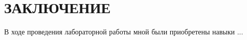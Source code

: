 \section*{ЗАКЛЮЧЕНИЕ}

В ходе проведения лабораторной работы мной были приобретены
навыки ...

\pagebreak
